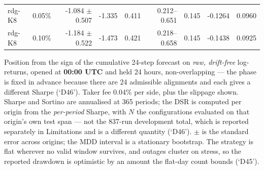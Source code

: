 \begin{table}[!t]
\begin{tabular}{llrrrrrrr}
rdg-K8 & 0.05\% & -1.084 $\pm$ 0.507 & -1.335 & 0.411 & 0.212--0.651 & 0.145 & -0.1264 & 0.0960 \\
rdg-K8 & 0.10\% & -1.184 $\pm$ 0.522 & -1.473 & 0.421 & 0.218--0.658 & 0.145 & -0.1438 & 0.0925 \\
\bottomrule
\end{tabular}
\vspace{2pt}\par\footnotesize Position from the sign of the cumulative 24-step forecast on \emph{raw, drift-free} log-returns, opened at \textbf{00:00 UTC} and held 24 hours, non-overlapping --- the phase is fixed in advance because there are 24 admissible alignments and each gives a different Sharpe (`D46'). Taker fee 0.04\% per side, plus the slippage shown. Sharpe and Sortino are annualised at 365 periods; the DSR is computed per origin from the \emph{per-period} Sharpe, with $N$ the configurations evaluated on that origin's own test span --- not the 837-run development total, which is reported separately in Limitations and is a different quantity (`D46'). $\pm$ is the standard error across origins; the MDD interval is a stationary bootstrap. The strategy is flat wherever no valid window survives, and outages cluster on stress, so the reported drawdown is optimistic by an amount the flat-day count bounds (`D45').
\end{table}
